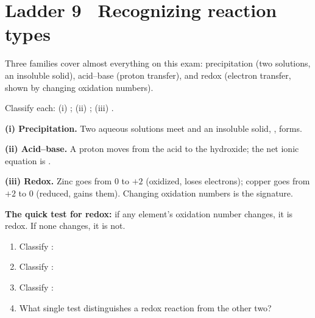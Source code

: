 \documentclass{apchem-worksheet}
\begin{document}
\section*{\sffamily Ladder 9 \textbullet\ Recognizing reaction types}

Three families cover almost everything on this exam: precipitation
(two solutions, an insoluble solid), acid--base (proton transfer), and
redox (electron transfer, shown by changing oxidation numbers).

\begin{workedexample}
Classify each: (i) ;
(ii) ;
(iii) .

\textbf{(i) Precipitation.} Two aqueous solutions meet and an insoluble
solid, , forms.

\textbf{(ii) Acid--base.} A proton moves from the acid to the hydroxide;
the net ionic equation is .

\textbf{(iii) Redox.} Zinc goes from 0 to $+2$ (oxidized, loses
electrons); copper goes from $+2$ to 0 (reduced, gains them). Changing
oxidation numbers is the signature.

\textbf{The quick test for redox:} if any element's oxidation number
changes, it is redox. If none changes, it is not.
\end{workedexample}

\begin{yourturn}
\begin{enumerate}[leftmargin=*,itemsep=0.5em]
  \item Classify : \workspace[1.4cm]
  \item Classify : \workspace[1.4cm]
  \item Classify :
        \workspace[1.4cm]
  \item What single test distinguishes a redox reaction from the other
        two? \workspace[1.6cm]
\end{enumerate}
\end{yourturn}
\end{document}
